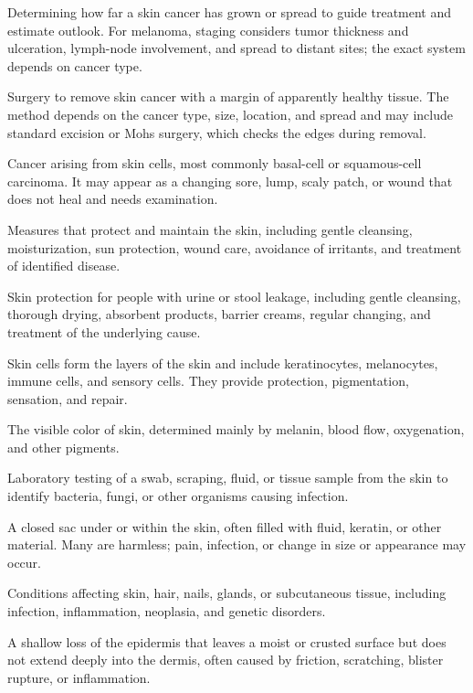  Determining how far a skin cancer has grown or spread to guide treatment and estimate outlook. For melanoma, staging considers tumor thickness and ulceration, lymph-node involvement, and spread to distant sites; the exact system depends on cancer type.

 Surgery to remove skin cancer with a margin of apparently healthy tissue. The method depends on the cancer type, size, location, and spread and may include standard excision or Mohs surgery, which checks the edges during removal.

 Cancer arising from skin cells, most commonly basal-cell or squamous-cell carcinoma. It may appear as a changing sore, lump, scaly patch, or wound that does not heal and needs examination.

 Measures that protect and maintain the skin, including gentle cleansing, moisturization, sun protection, wound care, avoidance of irritants, and treatment of identified disease.

 Skin protection for people with urine or stool leakage, including gentle cleansing, thorough drying, absorbent products, barrier creams, regular changing, and treatment of the underlying cause.

 Skin cells form the layers of the skin and include keratinocytes, melanocytes, immune cells, and sensory cells. They provide protection, pigmentation, sensation, and repair.

 The visible color of skin, determined mainly by melanin, blood flow, oxygenation, and other pigments.

 Laboratory testing of a swab, scraping, fluid, or tissue sample from the skin to identify bacteria, fungi, or other organisms causing infection.

 A closed sac under or within the skin, often filled with fluid, keratin, or other material. Many are harmless; pain, infection, or change in size or appearance may occur.

 Conditions affecting skin, hair, nails, glands, or subcutaneous tissue, including infection, inflammation, neoplasia, and genetic disorders.

 A shallow loss of the epidermis that leaves a moist or crusted surface but does not extend deeply into the dermis, often caused by friction, scratching, blister rupture, or inflammation.

